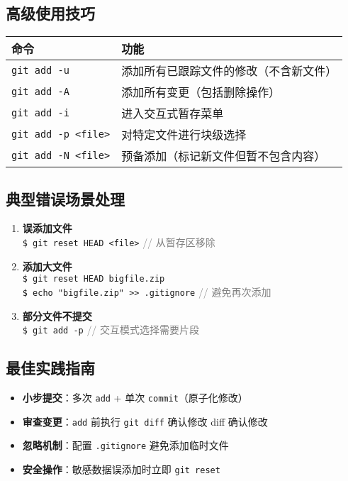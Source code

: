 \subsection{高级使用技巧}
\begin{center}
\begin{tabular}{@{}ll@{}}
    \toprule
    \textbf{命令} & \textbf{功能} \\
    \midrule
    \texttt{git add -u} & 添加所有已跟踪文件的修改（不含新文件） \\
    \texttt{git add -A} & 添加所有变更（包括删除操作） \\
    \texttt{git add -i} & 进入交互式暂存菜单 \\
    \texttt{git add -p <file>} & 对特定文件进行块级选择 \\
    \texttt{git add -N <file>} & 预备添加（标记新文件但暂不包含内容） \\
    \bottomrule
\end{tabular}
\end{center}

\subsection{典型错误场景处理}
\begin{enumerate}[leftmargin=*, nosep]
    \item \textbf{误添加文件} \\
    \texttt{\$ git reset HEAD <file>} \quad \textcolor{gray}{// 从暂存区移除}
    
    \item \textbf{添加大文件} \\
    \texttt{\$ git reset HEAD bigfile.zip} \\
    \texttt{\$ echo "bigfile.zip" >> .gitignore} \quad \textcolor{gray}{// 避免再次添加}
    
    \item \textbf{部分文件不提交} \\
    \texttt{\$ git add -p} \quad \textcolor{gray}{// 交互模式选择需要片段}
\end{enumerate}

\subsection{最佳实践指南}
\begin{itemize}[leftmargin=*, nosep]
    \item \textbf{小步提交}：多次 \texttt{add} + 单次 \texttt{commit}（原子化修改）
    \item \textbf{审查变更}：\texttt{add} 前执行 \texttt{git diff} 确认修改
    {diff} 确认修改
    \item \textbf{忽略机制}：配置 \texttt{.gitignore} 避免添加临时文件
    \item \textbf{安全操作}：敏感数据误添加时立即 \texttt{git reset}
\end{itemize}

